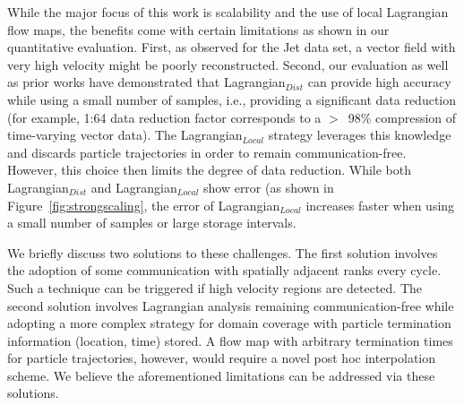 While the major focus of this work is scalability and the use of local Lagrangian flow maps, the benefits come with certain limitations as shown in our quantitative evaluation.
%
First, as observed for the Jet data set, a vector field with very high velocity might be poorly reconstructed.
%
%
Second, our evaluation as well as prior works have demonstrated that Lagrangian$_{Dist}$ can provide high accuracy while using a small number of samples, i.e., providing a significant data reduction (for example, 1:64 data reduction factor corresponds to a $>$~98\% compression of time-varying vector data).
%
The Lagrangian$_{Local}$ strategy leverages this knowledge and discards particle trajectories in order to remain communication-free.
%
However, this choice then limits the degree of data reduction.
%
While both Lagrangian$_{Dist}$ and Lagrangian$_{Local}$ show error (as shown in Figure~\ref{fig:strongscaling}, the error of Lagrangian$_{Local}$ increases faster when using a small number of samples or large storage intervals.
%

We briefly discuss two solutions to these challenges.
%
The first solution involves the adoption of some communication with spatially adjacent ranks every cycle.
%
Such a technique can be triggered if high velocity regions are detected.
%
%
The second solution involves Lagrangian analysis remaining communication-free while adopting a more complex strategy for domain coverage with particle termination information (location, time) stored.
%
A flow map with arbitrary termination times for particle trajectories, however, would require a novel post hoc interpolation scheme.
%
We believe the aforementioned limitations can be addressed via these solutions.

